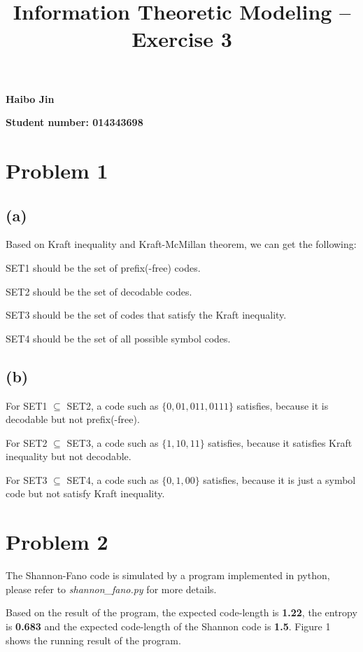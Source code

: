\documentclass{article}
\title{Information Theoretic Modeling -- Exercise 3}
\date{}
\begin{document}
\maketitle

{\centering \large \textbf{Haibo Jin}}

{\centering \large \textbf{Student number: 014343698}}

\section{Problem 1}

\subsection*{(a)}

Based on Kraft inequality and Kraft-McMillan theorem, we can get the following:

SET1 should be the set of prefix(-free) codes.

SET2 should be the set of decodable codes.

SET3 should be the set of codes that satisfy the Kraft inequality.

SET4 should be the set of all possible symbol codes.


\subsection*{(b)}

For SET1 ${\subseteq}$ SET2, a code such as \textbf{$\{0, 01, 011, 0111\}$} satisfies, because it is decodable but not prefix(-free).   

For SET2 ${\subseteq}$ SET3, a code such as \textbf{$\{1, 10, 11\}$} satisfies, because it satisfies Kraft inequality but not decodable. 

For SET3 ${\subseteq}$ SET4, a code such as \textbf{$\{0, 1, 00\}$} satisfies, because it is just a symbol code but not satisfy Kraft inequality. 

\section{Problem 2}

The Shannon-Fano code is simulated by a program implemented in python, please refer to \emph{shannon\_fano.py} for more details.

Based on the result of the program, the expected code-length is \textbf{1.22}, the entropy is \textbf{0.683} and the expected code-length of the Shannon code is \textbf{1.5}. Figure 1 shows the running result of the program.
\end{document}
